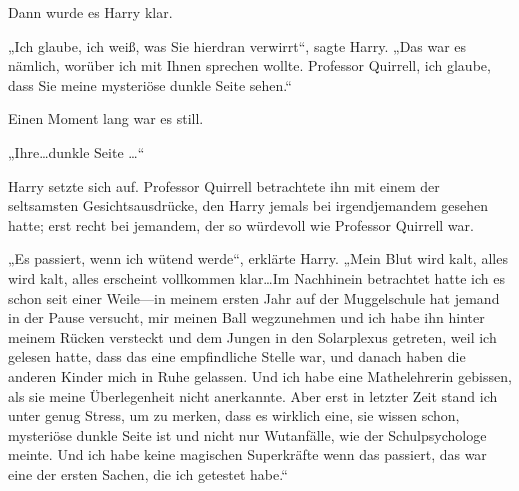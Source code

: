 Dann wurde es Harry klar.

„Ich glaube, ich weiß, was Sie hierdran verwirrt“, sagte Harry. „Das war es nämlich, worüber ich mit Ihnen sprechen wollte. Professor Quirrell, ich glaube, dass Sie meine mysteriöse dunkle Seite sehen.“

Einen Moment lang war es still.

„Ihre…dunkle Seite …“

Harry setzte sich auf. Professor Quirrell betrachtete ihn mit einem der seltsamsten Gesichtsausdrücke, den Harry jemals bei irgendjemandem gesehen hatte; erst recht bei jemandem, der so würdevoll wie Professor Quirrell war.

„Es passiert, wenn ich wütend werde“, erklärte Harry. „Mein Blut wird kalt, alles wird kalt, alles erscheint vollkommen klar…Im Nachhinein betrachtet hatte ich es schon seit einer Weile—in meinem ersten Jahr auf der Muggelschule hat jemand in der Pause versucht, mir meinen Ball wegzunehmen und ich habe ihn hinter meinem Rücken versteckt und dem Jungen in den Solarplexus getreten, weil ich gelesen hatte, dass das eine empfindliche Stelle war, und danach haben die anderen Kinder mich in Ruhe gelassen. Und ich habe eine Mathelehrerin gebissen, als sie meine Überlegenheit nicht anerkannte. Aber erst in letzter Zeit stand ich unter genug Stress, um zu merken, dass es wirklich eine, sie wissen schon, mysteriöse dunkle Seite ist und nicht nur Wutanfälle, wie der Schulpsychologe meinte. Und ich habe keine magischen Superkräfte wenn das passiert, das war eine der ersten Sachen, die ich getestet habe.“

